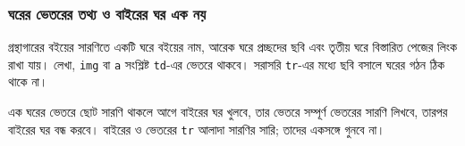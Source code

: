 \subsubsection{ঘরের ভেতরের তথ্য ও বাইরের ঘর এক নয়}
গ্রন্থাগারের বইয়ের সারণিতে একটি ঘরে বইয়ের নাম, আরেক ঘরে প্রচ্ছদের ছবি এবং তৃতীয় ঘরে বিস্তারিত পেজের লিংক রাখা যায়। লেখা, \texttt{img} বা \texttt{a} সংশ্লিষ্ট \texttt{td}-এর ভেতরে থাকবে। সরাসরি \texttt{tr}-এর মধ্যে ছবি বসালে ঘরের গঠন ঠিক থাকে না।

এক ঘরের ভেতরে ছোট সারণি থাকলে আগে বাইরের ঘর খুলবে, তার ভেতরে সম্পূর্ণ ভেতরের সারণি লিখবে, তারপর বাইরের ঘর বন্ধ করবে। বাইরের ও ভেতরের \texttt{tr} আলাদা সারণির সারি; তাদের একসঙ্গে গুনবে না।
